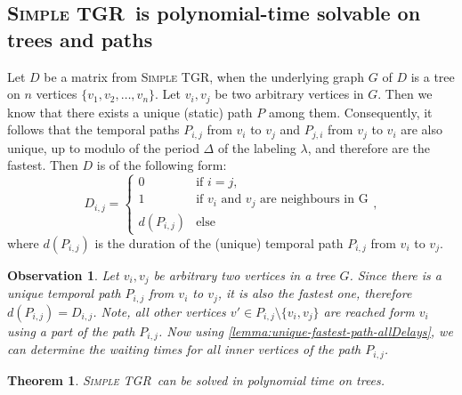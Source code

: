 \documentclass[11pt,a4paper]{article}
\newtheorem{theorem}{Theorem}
\newtheorem{observation}{Observation}
\theoremstyle{remark}
\theoremstyle{definition}
\newcommand{\deltaExact}{\textsc{Simple TGR}}
\begin{document}
\subsection{ \deltaExact\ is polynomial-time solvable on trees and paths}

Let $D$ be a matrix from \deltaExact, when the underlying graph $G$ of $D$ is a tree on $n$ vertices $\{v_1, v_2, \dots, v_n\}$.
Let $v_i,v_j$ be two arbitrary vertices in $G$. Then we know that there exists a unique (static) path $P$ among them.
Consequently, it follows that the temporal paths $P_{i,j}$ from $v_i$ to $v_j$ and $P_{j,i}$ from $v_j$ to $v_i$ are also unique, up to modulo of the period $\Delta$ of the labeling $\lambda$,
and therefore are the fastest.
Then $D$ is of the following form:
\begin{equation*}
    D_{i,j} =
    \begin{cases}
    0 & \text{if $i = j$}, \\
    1 & \text{if $v_i$ and $v_j$ are neighbours in G}\\
    d(P_{i,j}) & \text{else}
    \end{cases},
\end{equation*}
where $d(P_{i,j})$ is the duration of the (unique) temporal path $P_{i,j}$ from $v_i$ to $v_j$.

\begin{observation}\label{obs:travel-delays-in-trees}
    Let $v_i,v_j$  be arbitrary two vertices in a tree $G$. 
    Since there is a unique temporal path $P_{i,j}$ from $v_i$ to $v_j$, it is also the fastest one, therefore $d(P_{i,j}) = D_{i,j}$. 
    Note, all other vertices $v' \in P_{i,j} \setminus \{v_i,v_j\}$ are reached form $v_i$ using a part of the path $P_{i,j}$.
    Now using \cref{lemma:unique-fastest-path-allDelays}, we can determine the waiting times for all \emph{inner} vertices of the path $P_{i,j}$.
\end{observation}

\begin{theorem} \label{thm:deltaExact-PolyTimeTrees}
    \deltaExact\ can be solved in polynomial time on trees.
\end{theorem}
\end{document}
